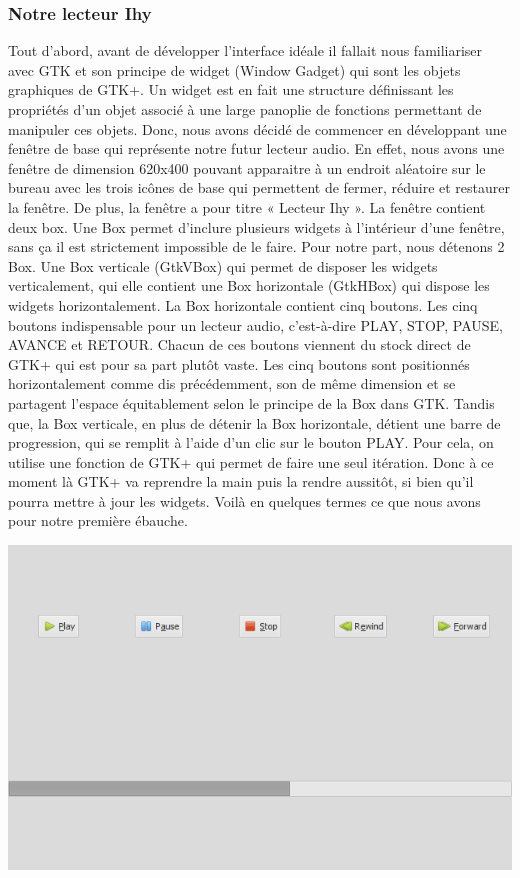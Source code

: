 \documentclass[a4paper,12pt]{article}
\begin{document}
		\subsubsection{Notre lecteur Ihy}
Tout d'abord, avant de développer l'interface idéale il fallait nous
familiariser avec GTK et son principe de widget (Window Gadget) qui sont les
objets graphiques de GTK+. Un widget est en fait une structure définissant les
propriétés d'un objet associé à une large panoplie de fonctions permettant de
manipuler ces objets. Donc, nous avons décidé de commencer en développant une
fenêtre de base qui représente notre futur lecteur audio. En effet, nous avons
une fenêtre de dimension 620x400 pouvant apparaitre à un endroit aléatoire sur
le bureau avec les trois icônes de base qui permettent de fermer, réduire et
restaurer la fenêtre. De plus, la fenêtre a pour titre « Lecteur Ihy ».  La
fenêtre contient deux box. Une Box permet d'inclure plusieurs widgets à
l'intérieur d'une fenêtre, sans ça il est strictement impossible de le faire.
Pour notre part, nous détenons 2 Box. Une Box verticale (GtkVBox) qui permet de
disposer les widgets verticalement, qui elle contient une Box horizontale
(GtkHBox) qui dispose les widgets horizontalement. La Box horizontale contient
cinq boutons. Les cinq boutons indispensable pour un lecteur audio, c'est-à-dire
PLAY, STOP, PAUSE, AVANCE et RETOUR. Chacun de ces boutons viennent du stock
direct de GTK+ qui est pour sa part plutôt vaste. Les cinq boutons sont
positionnés horizontalement comme dis précédemment, son de même dimension et se
partagent l'espace équitablement selon le principe de la Box dans GTK.  Tandis
que, la Box verticale, en plus de détenir la Box horizontale, détient une barre
de progression, qui se remplit à l'aide d'un clic sur le bouton PLAY. Pour
cela, on utilise une fonction de GTK+ qui permet de faire une seul itération.
Donc à ce moment là GTK+ va reprendre la main puis la rendre aussitôt, si bien
qu’il pourra mettre à jour les widgets.  Voilà en quelques termes ce que
nous avons pour notre première ébauche.
\begin{center}
\includegraphics[scale=0.50]{img/gtk.png}
\end{center}
\end{document}
